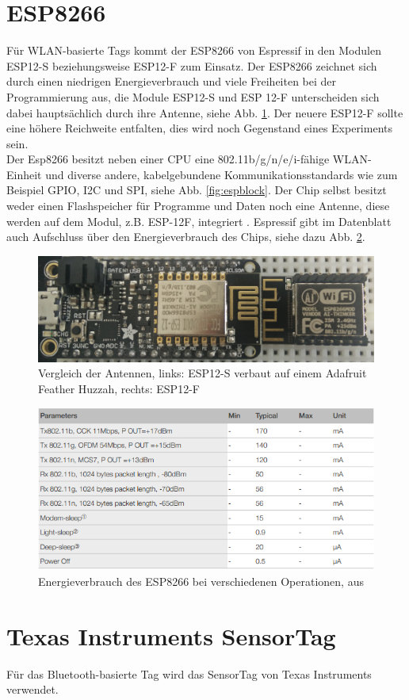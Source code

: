 \section{ESP8266}
Für WLAN-basierte Tags kommt der ESP8266 von Espressif in den Modulen ESP12-S beziehungsweise ESP12-F zum Einsatz.
Der ESP8266 zeichnet sich durch einen niedrigen Energieverbrauch und viele Freiheiten bei der Programmierung aus, die Module ESP12-S und ESP 12-F unterscheiden sich dabei hauptsächlich durch ihre Antenne, siehe Abb. \ref{fig:espmodules}.
Der neuere ESP12-F sollte eine höhere Reichweite entfalten, dies wird noch Gegenstand eines Experiments sein.\\
Der Esp8266 besitzt neben einer CPU eine 802.11b/g/n/e/i-fähige WLAN-Einheit und diverse andere, kabelgebundene Kommunikationsstandards wie zum Beispiel GPIO, I2C und SPI, siehe Abb. \ref{fig:espblock}.
Der Chip selbst besitzt weder einen Flashspeicher für Programme und Daten noch eine Antenne, diese werden auf dem Modul, z.B. ESP-12F, integriert \cite{espressif2017esp8266}.
Espressif gibt im Datenblatt auch Aufschluss über den Energieverbrauch des Chips, siehe dazu Abb. \ref{fig:esppower}.




\begin{figure}[h]
  \centering
	\includegraphics[width=\textwidth]{images/espmodules.png}
  \caption{Vergleich der Antennen, links: ESP12-S verbaut auf einem Adafruit Feather Huzzah, rechts: ESP12-F}
  \label{fig:espmodules}
\end{figure}

\begin{figure}[h]
  \centering
	\includegraphics[width=\textwidth]{images/esppower.png}
  \caption{Energieverbrauch des ESP8266 bei verschiedenen Operationen, aus \cite{espressif2017esp8266}}
  \label{fig:esppower}
\end{figure}

\section{Texas Instruments SensorTag}
Für das Bluetooth-basierte Tag wird das SensorTag von Texas Instruments verwendet.
